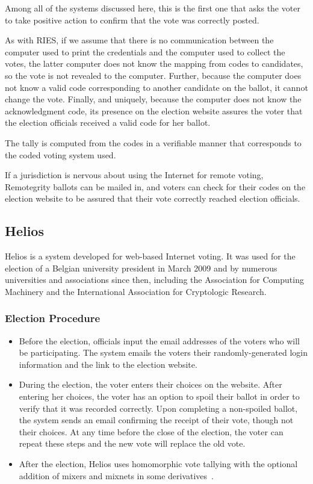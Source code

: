 Among all of the systems discussed here, this is the first one that
asks the voter to take positive action to confirm that the vote was
correctly posted.

As with RIES, if we assume that there is no communication between the
computer used to print the credentials and the computer used to
collect the votes, the latter computer does not know the mapping
from codes to candidates, so the vote is not revealed to the
computer. Further, because the computer does not know a valid code
corresponding to another candidate on the ballot, it cannot change the
vote. Finally, and uniquely, because the computer does not know the
acknowledgment code, its presence on the election website assures the
voter that the election officials received a valid code for her
ballot.

The tally is computed from the codes in a verifiable manner that
corresponds to the coded voting system used.

If a jurisdiction is nervous about using the Internet for remote
voting, Remotegrity ballots can be mailed in, and voters can check for
their codes on the election website to be assured that their vote
correctly reached election officials.

\subsection{Helios~\cite{adida2008,adida2009}}

Helios is a system developed for web-based Internet voting. It was
used for the election of a Belgian university president in March 2009
and by numerous universities and associations since then, including
the Association for Computing Machinery and the International
Association for Cryptologic Research.

\subsubsection{Election Procedure}

\begin{itemize}

\item Before the election, officials input the email addresses of the
  voters who will be participating. The system emails the voters their
  randomly-generated login information and the link to the election
  website.

\item During the election, the voter enters their choices on the
  website. After entering her choices, the voter has an option to
  spoil their ballot in order to verify that it was recorded
  correctly. Upon completing a non-spoiled ballot, the system sends an
  email confirming the receipt of their vote, though not their
  choices. At any time before the close of the election, the voter can
  repeat these steps and the new vote will replace the old vote.

\item After the election, Helios uses homomorphic vote tallying with
  the optional addition of mixers and mixnets in some
  derivatives~\cite{bulens2011,tsoukalas2013}.

\end{itemize}

